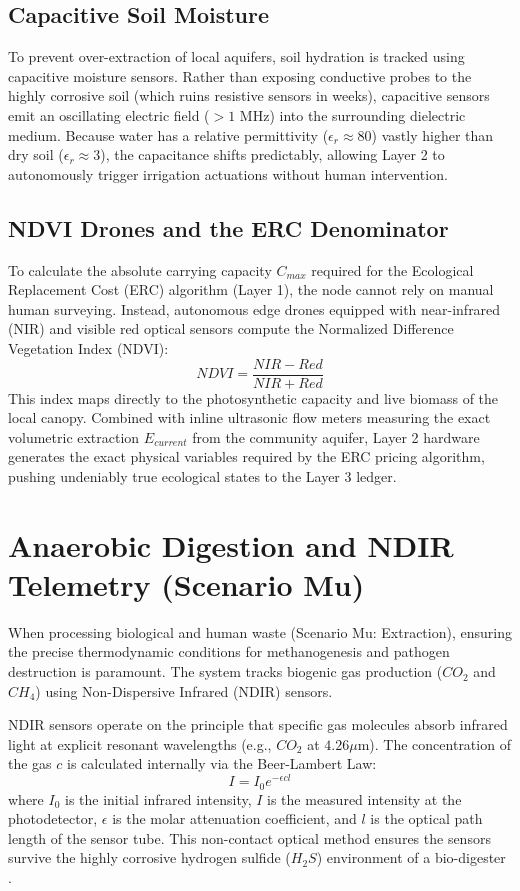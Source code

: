 \subsection{Capacitive Soil Moisture}
To prevent over-extraction of local aquifers, soil hydration is tracked using capacitive moisture sensors. Rather than exposing conductive probes to the highly corrosive soil (which ruins resistive sensors in weeks), capacitive sensors emit an oscillating electric field ($> 1$ MHz) into the surrounding dielectric medium. Because water has a relative permittivity ($\epsilon_r \approx 80$) vastly higher than dry soil ($\epsilon_r \approx 3$), the capacitance shifts predictably, allowing Layer 2 to autonomously trigger irrigation actuations without human intervention.

\subsection{NDVI Drones and the ERC Denominator}
To calculate the absolute carrying capacity $C_{max}$ required for the Ecological Replacement Cost (ERC) algorithm (Layer 1), the node cannot rely on manual human surveying. Instead, autonomous edge drones equipped with near-infrared (NIR) and visible red optical sensors compute the Normalized Difference Vegetation Index (NDVI):
\begin{equation}
NDVI = \frac{NIR - Red}{NIR + Red}
\end{equation}
This index maps directly to the photosynthetic capacity and live biomass of the local canopy. Combined with inline ultrasonic flow meters measuring the exact volumetric extraction $E_{current}$ from the community aquifer, Layer 2 hardware generates the exact physical variables required by the ERC pricing algorithm, pushing undeniably true ecological states to the Layer 3 ledger.

\section{Anaerobic Digestion and NDIR Telemetry (Scenario Mu)}
When processing biological and human waste (Scenario Mu: Extraction), ensuring the precise thermodynamic conditions for methanogenesis and pathogen destruction is paramount. The system tracks biogenic gas production ($CO_2$ and $CH_4$) using Non-Dispersive Infrared (NDIR) sensors.

NDIR sensors operate on the principle that specific gas molecules absorb infrared light at explicit resonant wavelengths (e.g., $CO_2$ at $4.26 \mu\text{m}$). The concentration of the gas $c$ is calculated internally via the Beer-Lambert Law:
\begin{equation}
I = I_0 e^{-\epsilon c l}
\end{equation}
where $I_0$ is the initial infrared intensity, $I$ is the measured intensity at the photodetector, $\epsilon$ is the molar attenuation coefficient, and $l$ is the optical path length of the sensor tube. This non-contact optical method ensures the sensors survive the highly corrosive hydrogen sulfide ($H_2S$) environment of a bio-digester \cite{hodgkinson2013non}.

